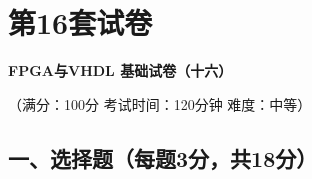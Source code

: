 \chapter{第16套试卷}

\begin{center}
\textbf{FPGA与VHDL 基础试卷（十六）}

（满分：100分 \hspace{2em} 考试时间：120分钟 \hspace{2em} 难度：中等）
\end{center}

\section*{一、选择题（每题3分，共18分）}

